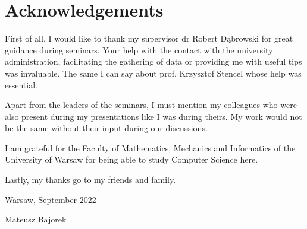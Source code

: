 \chapter*{Acknowledgements}

First of all, I would like to thank my supervisor dr Robert Dąbrowski for great guidance during seminars.
Your help with the contact with the university administration, facilitating the gathering of data or
providing me with useful tips was invaluable. The same I can say about prof. Krzysztof Stencel whose
help was essential.

Apart from the leaders of the seminars, I must mention my colleagues who were also present during my
presentations like I was during theirs. My work would not be the same without their input during our
discussions.

I am grateful for the Faculty of Mathematics, Mechanics and Informatics of the University of Warsaw
for being able to study Computer Science here.

Lastly, my thanks go to my friends and family.

\begin{flushright}
Warsaw, September 2022

Mateusz Bajorek
\end{flushright}
